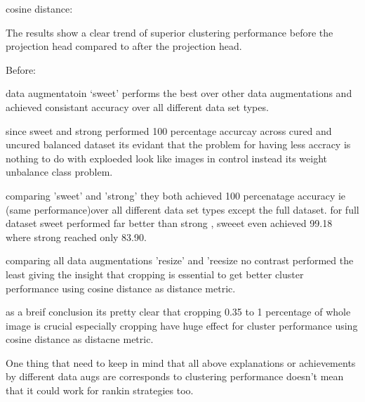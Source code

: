 cosine distance:

The results show a clear trend of superior clustering performance before the projection head compared to after the projection head.

Before: 

data augmentatoin ‘sweet’ performs the best over other data augmentations and achieved consistant accuracy over all different data set types. 

since sweet and strong performed 100 percentage accurcay across cured and uncured balanced dataset its evidant that the problem for having less accracy is nothing
 to do with exploeded look like images in control instead its weight unbalance class problem. 

comparing 'sweet' and 'strong' they both achieved 100 percenatage accuracy ie (same performance)over all different data set types except the full dataset.
for full dataset sweet performed far better than strong , sweeet even achieved 99.18 where strong reached only 83.90.

comparing all data augmentations 'resize' and 'reesize no contrast performed the least giving the insight that cropping is essential to get better cluster performance
 using cosine distance as distance metric.

 as a breif conclusion its pretty clear that cropping 0.35 to 1 percentage of whole image is crucial especially cropping have huge effect for cluster performance using cosine distance as distacne metric.

 One thing that need to keep in mind that all above explanations or achievements by different data augs are corresponds to clustering performance doesn't mean that
  it could work for rankin strategies too.
    
